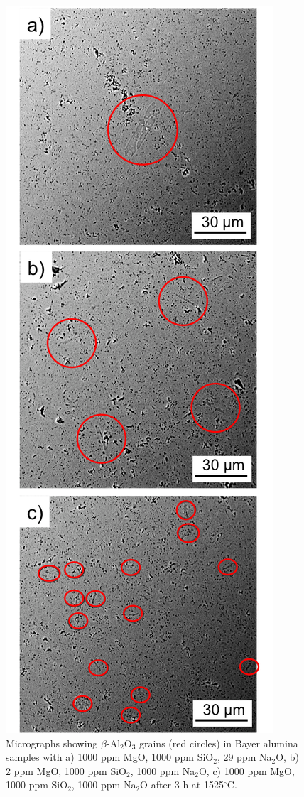 \newpage
\begin{figure}[H]
	\centering
	\includegraphics[scale=0.84]{Chapter-5/Figures/Figure5.png}
	\caption{Micrographs showing $\beta$-Al$_{2}$O$_{3}$ grains (red circles) in Bayer alumina samples with a) 1000 ppm MgO, 1000 ppm SiO$_{2}$, 29 ppm Na$_{2}$O, b) 2 ppm MgO, 1000 ppm SiO$_{2}$, 1000 ppm Na$_{2}$O, c) 1000 ppm MgO, 1000 ppm SiO$_{2}$, 1000 ppm Na$_{2}$O after 3 h at 1525$^{\circ}$C.}
	\label{Ch5-figure:Figure5}
\end{figure}

